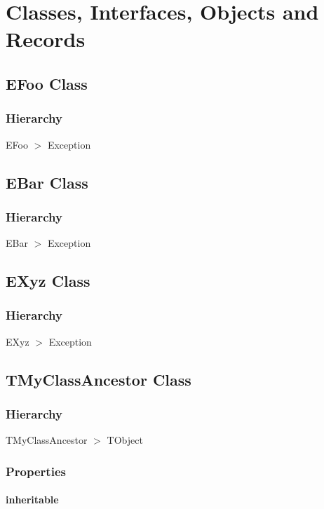 \documentclass{report}
\begin{document}
\section{Classes, Interfaces, Objects and Records}
\subsection*{EFoo Class}
\subsubsection*{\large{\textbf{Hierarchy}}\normalsize\hspace{1ex}\hfill}
EFoo {$>$} Exception
\subsection*{EBar Class}
\subsubsection*{\large{\textbf{Hierarchy}}\normalsize\hspace{1ex}\hfill}
EBar {$>$} Exception
\subsection*{EXyz Class}
\subsubsection*{\large{\textbf{Hierarchy}}\normalsize\hspace{1ex}\hfill}
EXyz {$>$} Exception
\subsection*{TMyClassAncestor Class}
\subsubsection*{\large{\textbf{Hierarchy}}\normalsize\hspace{1ex}\hfill}
TMyClassAncestor {$>$} TObject
\subsubsection*{\large{\textbf{Properties}}\normalsize\hspace{1ex}\hfill}
\paragraph*{inheritable}\hspace*{\fill}
\end{document}
